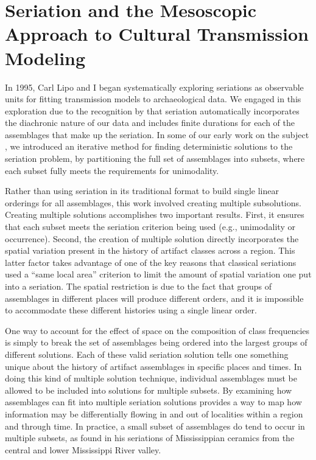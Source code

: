 \section{Seriation and the Mesoscopic Approach to Cultural Transmission Modeling}

In 1995, Carl Lipo and I \citep{huntmadsenlipo1995a,lipomadsenhunt1995b,Lipo1997,Lipo2001neutrality,lipomadsen1997,Lipo2001a,Lipo2001} began systematically exploring seriations as observable units for fitting transmission models to archaeological data.  We engaged in this exploration due to the recognition by \citet{Dunnell1970} that seriation automatically incorporates the diachronic nature of our data and includes finite durations for each of the assemblages that make up the seriation. In some of our early work on the subject , we introduced an iterative method for finding deterministic solutions to the seriation problem, by partitioning the full set of assemblages into subsets, where each subset fully meets the requirements for unimodality.  

Rather than using seriation in its traditional format to build single linear orderings for all assemblages, this work involved creating multiple subsolutions.  Creating multiple solutions accomplishes two important results. First, it ensures that each subset meets the seriation criterion being used (e.g., unimodality or occurrence). Second, the creation of multiple solution directly incorporates the spatial variation present in the history of artifact classes across a region. This latter factor takes advantage of one of the key reasons that classical seriations used a “same local area” criterion to limit the amount of spatial variation one put into a seriation.  The spatial restriction is due to the fact that groups of assemblages in different places will produce different orders, and it is impossible to accommodate these different histories using a single linear order.  

One way to account for the effect of space on the composition of class frequencies is simply to break the set of assemblages being ordered into the largest groups of different solutions. Each of these valid seriation solution tells one something unique about the history of artifact assemblages in specific places and times. In doing this kind of multiple solution technique, individual assemblages must be allowed to be included into solutions for multiple subsets. By examining how assemblages can fit into multiple seriation solutions provides a way to map how information may be differentially flowing in and out of localities within a region and through time. In practice, a small subset of assemblages do tend to occur in multiple subsets, as \citet{Lipo2001} found in his seriations of Mississippian ceramics from the central and lower Mississippi River  valley.  

